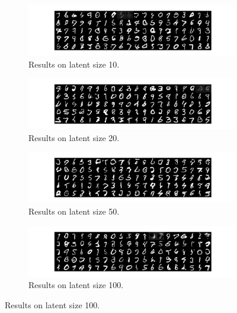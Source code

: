 \documentclass[12pt,letterpaper]{article}
\begin{document}
\begin{figure}[h]
    \begin{subfigure}{0.49\textwidth}
    \includegraphics[width=\linewidth]{GAN_MNIST_0_10_256.png}
    \caption{\small Results on latent size 10.} \label{fig:a}
    \end{subfigure}\hspace*{\fill}
    \begin{subfigure}{0.49\textwidth}
    \includegraphics[width=\linewidth]{GAN_MNIST_0_20_256.png}
    \caption{\small Results on latent size 20.} \label{fig:b}
    \end{subfigure}
    
    \medskip
    \begin{subfigure}{0.49\textwidth}
    \includegraphics[width=\linewidth]{GAN_MNIST_0_50_256.png}
    \caption{\small Results on latent size 50.} \label{fig:c}
    \end{subfigure}\hspace*{\fill}
    \begin{subfigure}{0.49\textwidth}
    \includegraphics[width=\linewidth]{GAN_MNIST_0_100_256.png}
    \caption{\small Results on latent size 100.} \label{fig:d}
    \end{subfigure}
    

\end{figure}
\end{document}

